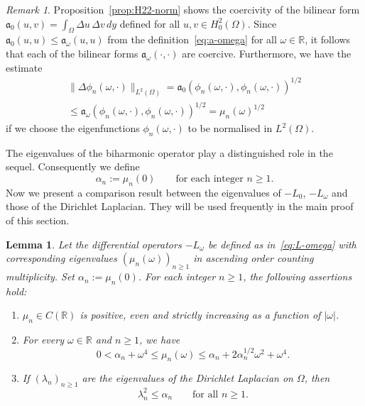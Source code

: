 \documentclass[a4paper, reqno]{amsart}
\numberwithin{equation}{section}
\theoremstyle{plain}
\newtheorem{lemma}[theorem]{Lemma}
\theoremstyle{definition}
\theoremstyle{remark}
\newtheorem{remark}[theorem]{Remark}
\newcommand{\mfra}{\mathfrak{a}}
\newcommand{\RR}{\mathbb{R}}
\begin{document}
\begin{remark}
  \label{rmk:quad}
  Proposition~\ref{prop:H22-norm} shows the coercivity of the bilinear form $\mfra_0(u,v) = \int_\Omega \Delta u \, \Delta v \,dy$ defined for all $u, v \in H^2_0(\Omega)$. Since $\mfra_0(u,u) \leq \mfra_{\omega}(u,u)$ from the definition~\eqref{eq:a-omega} for all $\omega \in \RR$, it follows that each of the bilinear forms $\mfra_\omega(\cdot,\cdot)$ are coercive. Furthermore, we have the estimate
  \begin{multline}
    \label{eq:D2phi-estimate}
    \| \Delta \phi_n(\omega, \cdot) \|_{L^2(\Omega)}
    = \mfra_0(\phi_n(\omega, \cdot), \phi_n(\omega, \cdot))^{1/2}\\
    \leq \mfra_\omega(\phi_n(\omega, \cdot), \phi_n(\omega, \cdot))^{1/2}
    = \mu_n(\omega)^{1/2}
  \end{multline}
  if we choose the eigenfunctions $\phi_n(\omega,\cdot)$ to be normalised in $L^2(\Omega)$.
\end{remark}

The eigenvalues of the biharmonic operator play a distinguished role in the sequel. Consequently we define
\begin{equation*}
  \alpha_n := \mu_n(0) \qquad \text{for each integer } n \ge 1.
\end{equation*}
Now we present a comparison result between the eigenvalues of $-L_0$, $-L_\omega$ and those of the Dirichlet Laplacian. They will be used frequently in the main proof of this section.

\begin{lemma}
  \label{lem:mu-omegas}
  Let the differential operators $-L_\omega$ be defined as in~\eqref{eq:L-omega} with corresponding eigenvalues $(\mu_n(\omega))_{n \ge 1}$ in ascending order counting multiplicity. Set $\alpha_n := \mu_n(0)$. For each integer $n \ge 1$, the following assertions hold:
  \begin{enumerate}[\upshape (i)]
  \item $\mu_n\in C(\RR)$ is positive, even and strictly increasing as a function of $|\omega|$.
  \item For every $\omega \in \RR$ and $n\geq 1$, we have
    \begin{equation*}
      0
      <\alpha_n + \omega^4
      \leq \mu_n(\omega)
      \leq \alpha_n + 2 \alpha_n^{1/2} \omega^2 + \omega^4.
    \end{equation*}
  \item If $(\lambda_n)_{n\geq 1}$ are the eigenvalues of the Dirichlet Laplacian on $\Omega$, then
    \begin{equation}
      \label{eq:DL-biharmonic}
      \lambda_n^2 \leq \alpha_n \qquad \text{for all } n \ge 1.
    \end{equation}
  \end{enumerate}
\end{lemma}
\end{document}

